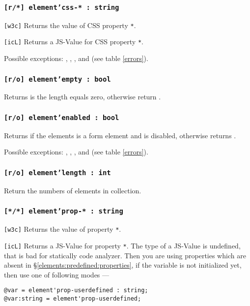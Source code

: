\subsubsection{\texttt{[r/*] element'css-* : string}}

\texttt{[w3c]} Returns the value of CSS property \texttt{*}.

\texttt{[icL]} Returns a JS-Value for CSS property \texttt{*}.

Possible exceptions: , , ,  and  (see table \ref{errors}).

\subsubsection{\texttt{[r/o] element'empty : bool}}

Returns \true{} is the length equals zero, otherwise return \false.

\subsubsection{\texttt{[r/o] element'enabled : bool}}

Returns \false{} if the elements is a form element and is disabled, otherwise returns \true.

Possible exceptions: , , ,  and  (see table \ref{errors}).

\subsubsection{\texttt{[r/o] element'length : int}}

Return the numbers of elements in collection.

\subsubsection{\texttt{[*/*] element'prop-* : string}}

\texttt{[w3c]} Returns the value of property \texttt{*}.

\texttt{[icL]} Returns a JS-Value for property \texttt{*}. The type of a JS-Value is undefined, that is bad for statically code analyzer. Then you are using properties which are absent in §\ref{elements:predefined:properties}, if the variable is not initialized yet, then use one of following modes —
\begin{verbatim}
@var = element'prop-userdefined : string;
@var:string = element'prop-userdefined;
\end{verbatim}

